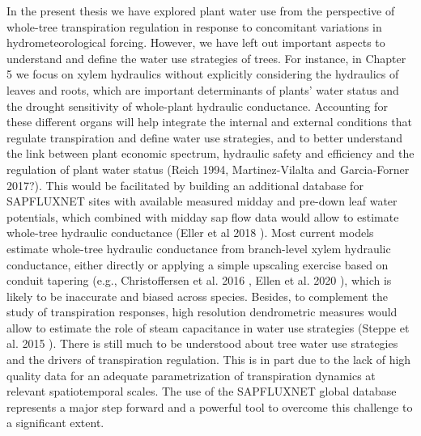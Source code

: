 \documentclass[11pt,twoside]{reedthesis}
\begin{document}
In the present thesis we have explored plant water use from the
perspective of whole-tree transpiration regulation in response to
concomitant variations in hydrometeorological forcing. However, we have
left out important aspects to understand and define the water use
strategies of trees. For instance, in Chapter 5 we focus on xylem
hydraulics without explicitly considering the hydraulics of leaves and
roots, which are important determinants of plants' water status and the
drought sensitivity of whole-plant hydraulic conductance. Accounting for
these different organs will help integrate the internal and external
conditions that regulate transpiration and define water use strategies,
and to better understand the link between plant economic spectrum,
hydraulic safety and efficiency and the regulation of plant water status
(Reich 1994, Martinez-Vilalta and Garcia-Forner 2017?). This would be
facilitated by building an additional database for SAPFLUXNET sites with
available measured midday and pre-down leaf water potentials, which
combined with midday sap flow data would allow to estimate whole-tree
hydraulic conductance (Eller et al 2018 ). Most current models estimate
whole-tree hydraulic conductance from branch-level xylem hydraulic
conductance, either directly or applying a simple upscaling exercise
based on conduit tapering (e.g., Christoffersen et al. 2016 , Ellen et
al. 2020 ), which is likely to be inaccurate and biased across species.
Besides, to complement the study of transpiration responses, high
resolution dendrometric measures would allow to estimate the role of
steam capacitance in water use strategies (Steppe et al. 2015 ). There
is still much to be understood about tree water use strategies and the
drivers of transpiration regulation. This is in part due to the lack of
high quality data for an adequate parametrization of transpiration
dynamics at relevant spatiotemporal scales. The use of the SAPFLUXNET
global database represents a major step forward and a powerful tool to
overcome this challenge to a significant extent.\par
\newpage
\end{document}
